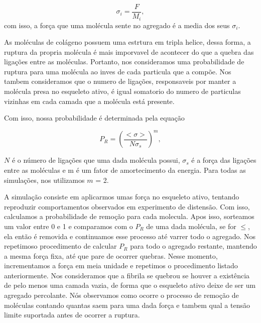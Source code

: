 \documentclass{article}
\begin{document}
        \begin{equation}
            \sigma_{i} = \frac{F}{M_{i}},
        \end{equation}
        \noindent com isso, a força que uma molécula sente no agregado é a media dos seus $\sigma_{i}$.

        As moléculas de colágeno possuem uma estrtura em tripla helice\cite{BRODSKY1997545}, dessa forma, a ruptura da propria molécula é mais imporvavel 
        de acontecer do que a quebra das ligações entre as moléculas\cite{Parkinson1997}. Portanto, nos consideramos uma probabilidade de ruptura para uma
        molécula ao inves de cada particula que a compõe. Nos tambem consideramos que o numero de ligações, responsaveis por manter a molécula presa no 
        esqueleto ativo, é igual somatorio do numero de particulas vizinhas em cada camada que a molécula está presente.

        Com isso, nossa probabilidade é determinada pela equação

        \begin{equation}
            P_{R} = (\frac{<\sigma>}{N\sigma_{s}})^{m},
        \end{equation}

        \noindent $N$ é o número de ligações que uma dada molécula possui, $\sigma_{s}$ é a força das ligações entre as moléculas e m é um fator de 
        amortecimento da energia\cite{Parkinson1997,2013}. Para todas as simulações, nos utilizamos $m$ = 2.

        A simulação consiste em aplicarmos umas força no esqueleto ativo, tentando reproduzir comportamentos observados em experimento de distensão. 
        Com isso, calculamos a probabilidade de remoção para cada molecula. Apos isso, sorteamos um valor entre 0 e 1 e comparamos com o $P_{R}$ de uma
        dada molécula, se for $\leq$, ela então é removida e continuamos esse processo até varrer todo o agregado.  Nos repetimoso procedimento de calcular
        $P_{R}$ para todo o agregado restante, mantendo a mesma força fixa, até que pare de ocorrer quebras. Nesse momento, incrementamos a força em meia 
        unidade e repetimos o procedimento listado anteriormente. Nos consideramos que a fibrila se quebrou se houver a existência de pelo menos uma camada
        vazia, de forma que o esqueleto ativo deixe de ser um agregado percolante. Nós observamos como ocorre o processo de remoção de moléculas contando 
        quantas saem para uma dada força e tambem qual a tensão limite suportada antes de ocorrer a ruptura.
\end{document}
